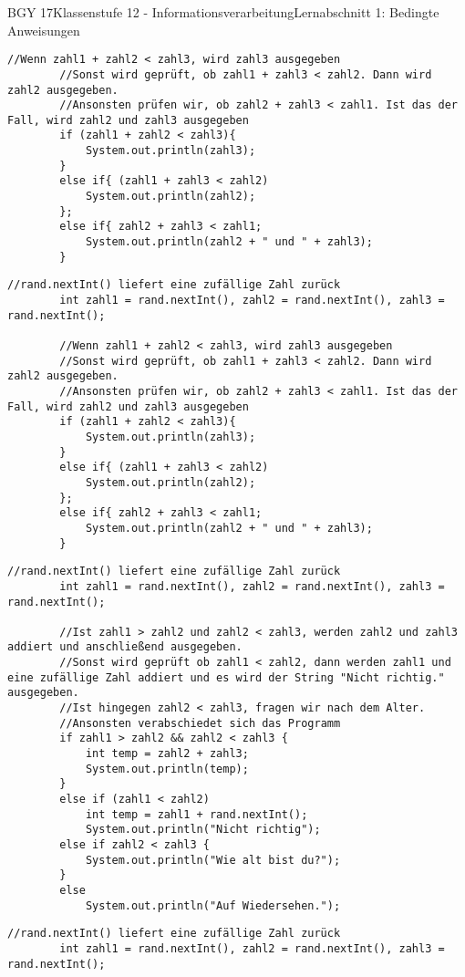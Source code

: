\documentclass[oneside,openany,headings=optiontotoc,11pt,numbers=noenddot]{scrreprt}
\begin{document}
\begin{worksheet}{BGY 17}{Klassenstufe 12 - Informationsverarbeitung}{Lernabschnitt 1: Bedingte Anweisungen}
\begin{lstlisting}[style=JavaInputStyle]
		//Wenn zahl1 + zahl2 < zahl3, wird zahl3 ausgegeben
		//Sonst wird geprüft, ob zahl1 + zahl3 < zahl2. Dann wird zahl2 ausgegeben.
		//Ansonsten prüfen wir, ob zahl2 + zahl3 < zahl1. Ist das der Fall, wird zahl2 und zahl3 ausgegeben
		if (zahl1 + zahl2 < zahl3){
			System.out.println(zahl3);
		}
		else if{ (zahl1 + zahl3 < zahl2)
			System.out.println(zahl2);
		};
		else if{ zahl2 + zahl3 < zahl1;
			System.out.println(zahl2 + " und " + zahl3);
		}
		\end{lstlisting}
		\newpage
		\begin{lstlisting}[style=JavaInputStyle]
		//rand.nextInt() liefert eine zufällige Zahl zurück
		int zahl1 = rand.nextInt(), zahl2 = rand.nextInt(), zahl3 = rand.nextInt();
		
		//Wenn zahl1 + zahl2 < zahl3, wird zahl3 ausgegeben
		//Sonst wird geprüft, ob zahl1 + zahl3 < zahl2. Dann wird zahl2 ausgegeben.
		//Ansonsten prüfen wir, ob zahl2 + zahl3 < zahl1. Ist das der Fall, wird zahl2 und zahl3 ausgegeben
		if (zahl1 + zahl2 < zahl3){
			System.out.println(zahl3);
		}
		else if{ (zahl1 + zahl3 < zahl2)
			System.out.println(zahl2);
		};
		else if{ zahl2 + zahl3 < zahl1;
			System.out.println(zahl2 + " und " + zahl3);
		}
		\end{lstlisting}
		\newpage
		\begin{lstlisting}[style=JavaInputStyle]
		//rand.nextInt() liefert eine zufällige Zahl zurück
		int zahl1 = rand.nextInt(), zahl2 = rand.nextInt(), zahl3 = rand.nextInt();
		
		//Ist zahl1 > zahl2 und zahl2 < zahl3, werden zahl2 und zahl3 addiert und anschließend ausgegeben.
		//Sonst wird geprüft ob zahl1 < zahl2, dann werden zahl1 und eine zufällige Zahl addiert und es wird der String "Nicht richtig." ausgegeben.
		//Ist hingegen zahl2 < zahl3, fragen wir nach dem Alter.
		//Ansonsten verabschiedet sich das Programm
		if zahl1 > zahl2 && zahl2 < zahl3 {
			int temp = zahl2 + zahl3;
			System.out.println(temp);
		}
		else if (zahl1 < zahl2)
			int temp = zahl1 + rand.nextInt();
			System.out.println("Nicht richtig");
		else if zahl2 < zahl3 {
			System.out.println("Wie alt bist du?");
		}
		else
			System.out.println("Auf Wiedersehen.");
		\end{lstlisting}
		\newpage
		\begin{lstlisting}[style=JavaInputStyle]
		//rand.nextInt() liefert eine zufällige Zahl zurück
		int zahl1 = rand.nextInt(), zahl2 = rand.nextInt(), zahl3 = rand.nextInt();
		

\end{lstlisting}
\end{worksheet}
\end{document}
